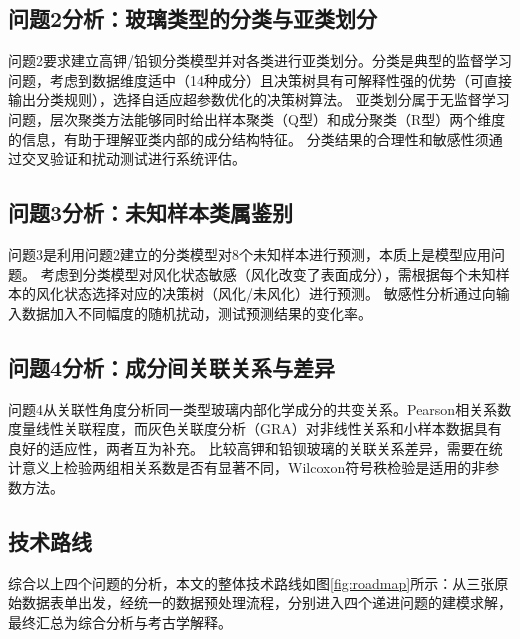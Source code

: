 \documentclass[12pt,a4paper]{ctexart}
\begin{document}
\subsection{问题2分析：玻璃类型的分类与亚类划分}

问题2要求建立高钾/铅钡分类模型并对各类进行亚类划分。分类是典型的监督学习问题，考虑到数据维度适中（14种成分）且决策树具有可解释性强的优势（可直接输出分类规则），选择自适应超参数优化的决策树算法。
亚类划分属于无监督学习问题，层次聚类方法能够同时给出样本聚类（Q型）和成分聚类（R型）两个维度的信息，有助于理解亚类内部的成分结构特征。
分类结果的合理性和敏感性须通过交叉验证和扰动测试进行系统评估。

\subsection{问题3分析：未知样本类属鉴别}

问题3是利用问题2建立的分类模型对8个未知样本进行预测，本质上是模型应用问题。
考虑到分类模型对风化状态敏感（风化改变了表面成分），需根据每个未知样本的风化状态选择对应的决策树（风化/未风化）进行预测。
敏感性分析通过向输入数据加入不同幅度的随机扰动，测试预测结果的变化率。

\subsection{问题4分析：成分间关联关系与差异}

问题4从关联性角度分析同一类型玻璃内部化学成分的共变关系。Pearson相关系数度量线性关联程度，而灰色关联度分析（GRA）对非线性关系和小样本数据具有良好的适应性\cite{4}，两者互为补充。
比较高钾和铅钡玻璃的关联关系差异，需要在统计意义上检验两组相关系数是否有显著不同，Wilcoxon符号秩检验是适用的非参数方法。

\subsection{技术路线}

综合以上四个问题的分析，本文的整体技术路线如图\ref{fig:roadmap}所示：从三张原始数据表单出发，经统一的数据预处理流程，分别进入四个递进问题的建模求解，最终汇总为综合分析与考古学解释。
\end{document}

